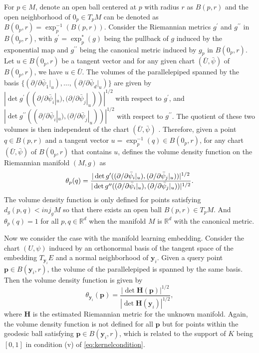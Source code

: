 \documentclass[11pt,a4paper,]{article}
\begin{document}
For \(p \in M\), denote an open ball centered at \(p\) with radius \(r\) as \(B(p,r)\) and the open neighborhood of \(0_p \in T_pM\) can be denoted as \(B(0_p,r)=\exp_p^{-1}(B(p,r))\). Consider the Riemannian metrics \(g^{\prime}\) and \(g^{\prime \prime}\) in \(B(0_p,r)\), with \(g^{\prime} = \exp^{\ast}_p(g)\) being the pullback of \(g\) induced by the exponential map and \(g^{\prime \prime}\) being the canonical metric induced by \(g_p\) in \(B(0_p,r)\).
Let \(u \in B(0_p,r)\) be a tangent vector and for any given chart \((\bar{U}, \bar{\psi})\) of \(B(0_p,r)\), we have \(u \in \bar{U}\).
The volumes of the parallelepiped spanned by the basis \(\{(\partial / \partial\bar{\psi}_1|_u), \dots, (\partial / \partial\bar{\psi}_d|_u)\}\) are given by \(| \det g^{\prime}((\partial / \partial\bar{\psi}_i|_u), (\partial / \partial\bar{\psi}_j|_u)) |^{1/2}\) with respect to \(g^{\prime}\), and \(| \det g^{\prime \prime}((\partial / \partial\bar{\psi}_i|_u), (\partial / \partial\bar{\psi}_j|_u)) |^{1/2}\) with respect to \(g^{\prime \prime}\). The quotient of these two volumes is then independent of the chart \((\bar{U}, \bar{\psi})\) \autocite{Henry2009-om}.
Therefore, given a point \(q \in B(p,r)\) and a tangent vector \(u = \exp^{-1}_p(q) \in B(0_p,r)\), for any chart \((\bar{U}, \bar{\psi})\) of \(B(0_p,r)\) that contains \(u\), \textcite{Henry2009-om} defines the volume density function on the Riemannian manifold \((M,g)\) as
\begin{equation}
\label{eq:volumedensityratio}
\theta_p(q) = \frac{| \det g^{\prime}((\partial / \partial\bar{\psi}_i|_u), (\partial / \partial\bar{\psi}_j|_u)) |^{1/2} }{ | \det g^{\prime \prime}((\partial / \partial\bar{\psi}_i|_u), (\partial / \partial\bar{\psi}_j|_u)) |^{1/2} } \\ .
\end{equation}
The volume density function is only defined for points satisfying \(d_g(p,q) < inj_gM\) so that there exists an open ball \(B(p,r) \in T_pM\). And \(\theta_p(q)=1\) for all \(p,q \in \mathbb{R}^d\) when the manifold \(M\) is \(\mathbb{R}^d\) with the canonical metric.

Now we consider the case with the manifold learning embedding. Consider the chart \((U, \psi)\) induced by an orthonormal basis of the tangent space of the embedding \(T_{\pmb{y}_i}E\) and a normal neighborhood of \(\pmb{y}_i\). Given a query point \(\pmb{p} \in B(\pmb{y}_i,r)\), the volume of the parallelepiped is spanned by the same basis.\\
Then the volume density function is given by
\begin{equation}
\label{eq:volumedensityest}
\theta_{\pmb{y}_i}(\pmb{p}) = \frac{|\det \pmb{H}(\pmb{p})|^{1/2}}{|\det \pmb{H}(\pmb{y}_i)|^{1/2}},
\end{equation}
where \(\pmb{H}\) is the estimated Riemannian metric for the unknown manifold.
Again, the volume density function is not defined for all \(\pmb{p}\) but for points within the geodesic ball satisfying \(\pmb{p} \in B(\pmb{y}_i,r)\), which is related to the support of \(K\) being \([0,1]\) in condition (v) of \eqref{eq:kernelcondition}.
\end{document}
